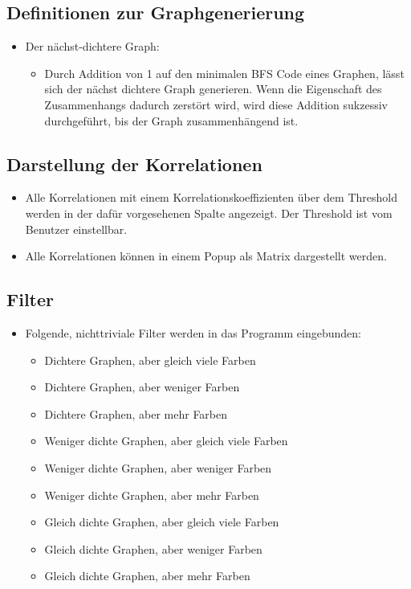 \documentclass[13pt]{scrreprt}
\begin{document}
\subsection{Definitionen zur Graphgenerierung}
    \begin{itemize} [label={}]
	\item Der nächst-dichtere Graph:
	\begin{itemize} [label={}]
	\item Durch Addition von 1 auf den minimalen BFS Code eines Graphen, lässt sich der nächst dichtere Graph generieren. Wenn die Eigenschaft des Zusammenhangs dadurch zerstört wird, wird diese Addition sukzessiv durchgeführt, bis der Graph zusammenhängend ist.
	\end{itemize}
	\end{itemize}
	
\subsection{Darstellung der Korrelationen}
	\begin{itemize} [label={}]
	\item Alle Korrelationen mit einem Korrelationskoeffizienten über dem Threshold werden in der dafür vorgesehenen Spalte angezeigt. Der Threshold ist vom Benutzer einstellbar.
	\item Alle Korrelationen können in einem Popup als Matrix dargestellt werden.
	\end{itemize}
	
\subsection{Filter}
	\begin{itemize} [label={}]
    \item Folgende, nichttriviale Filter werden in das Programm eingebunden:
	\begin{itemize} [label={}]
	\item Dichtere Graphen, aber gleich viele Farben
	\item Dichtere Graphen, aber weniger Farben
	\item Dichtere Graphen, aber mehr Farben
	\item Weniger dichte Graphen, aber gleich viele Farben
	\item Weniger dichte Graphen, aber weniger Farben
	\item Weniger dichte Graphen, aber mehr Farben
	\item Gleich dichte Graphen, aber gleich viele Farben
	\item Gleich dichte Graphen, aber weniger Farben
	\item Gleich dichte Graphen, aber mehr Farben
	\end{itemize}
	\end{itemize}
	
\end{document}
